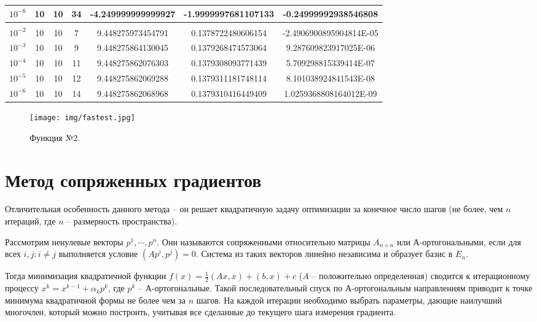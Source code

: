\documentclass[12pt]{article}
\begin{document}
\begin{table}[H]
\begin{tabular}{|c|c|c|c|c|c|c|}
$10^{-6}$ & 10 & 10 & 34   & -4.249999999999927  & -1.9999997681107133 & -0.24999992938546808    \\ \hline
\rowcolor[HTML]{FFF0DB} 
\multicolumn{7}{|c|}{\cellcolor[HTML]{FFF0DB}$29x^2+18y^2-8x+10$}                                \\ \hline
$10^{-2}$ & 10 & 10 & 7    & 9.448275973454791   & 0.1378722480606154  & -2.4906900895904814E-05 \\ \hline
$10^{-3}$ & 10 & 10 & 9    & 9.448275864130045   & 0.1379268474573064  & 9.287609823917025E-06   \\ \hline
$10^{-4}$ & 10 & 10 & 11   & 9.448275862076303   & 0.1379308093771439  & 5.709298815339414E-07   \\ \hline
$10^{-5}$ & 10 & 10 & 12   & 9.448275862069288   & 0.1379311181748114  & 8.101038924841543E-08   \\ \hline
$10^{-6}$ & 10 & 10 & 14   & 9.448275862068968   & 0.1379310416449409  & 1.0259368808164012E-09  \\ \hline
\end{tabular}
\end{table}

\begin{figure}[H]
	\centering
	\texttt{[image: img/fastest.jpg]}
	\caption{Функция №2.}
\end{figure}

\newpage
\section{Метод сопряженных градиентов}

Отличительная особенность данного метода -- он решает квадратичную задачу оптимизации за конечное число шагов (не более, чем $n$ итераций, где $n$ -- размерность пространства).

Рассмотрим ненулевые векторы $p^1, \cdots, p^n$. Они называются сопряженными относительно матрицы $A_{n \times n}$ или А-ортогональными, если для всех $i, j: i \neq j$ выполняется условие $\left(Ap^i, p^j \right) = 0$. Система из таких векторов линейно независима и образует базис в $E_n$. 

Тогда минимизация квадратичной функции $f(x) = \frac{1}{2} \left(Ax, x \right) + \left(b, x \right) + c$ ($A$ -- положительно определенная) сводится к итерационному процессу $x^k=x^{k-1}+\alpha_k p^k$, где $p^k$ -- А-ортогональные. Такой последовательный спуск по А-ортогональным направлениям приводит к точке минимума квадратичной формы не более чем за $n$ шагов. На каждой итерации необходимо выбрать параметры, дающие наилучший многочлен, который можно построить, учитывая все сделанные до текущего шага измерения градиента.
\end{document}
